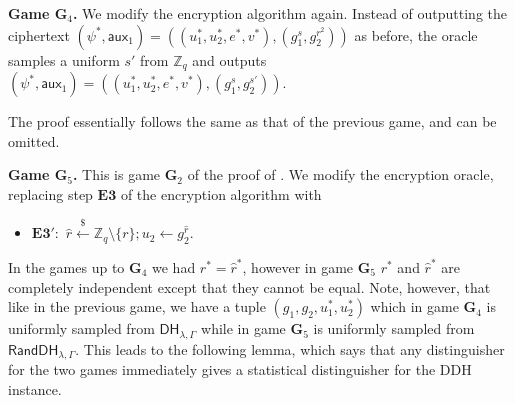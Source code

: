 \documentclass[10pt,a4paper]{article}
\newcommand{\rgets}{\xleftarrow{\$}}
\newcommand{\aux}{\mathsf{aux}}
\newcommand{\game}{\mathbf{G}}
\newcommand{\estep}[1]{\mathbf{E#1}}
\newcommand{\Z}{\mathbb{Z}}
\newcommand{\randdh}{\mathsf{RandDH}}
\newcommand{\ddh}{\mathsf{DH}}
\begin{document}
	\textbf{Game $\game_4$.} We modify the encryption algorithm again. Instead of outputting the ciphertext $(\psi^{*}, \aux_1) = ((u_1^{*}, u_2^{*}, e^{*}, v^{*}), (g_1^{s}, g_2^{r^2}))$ as before, the oracle samples a uniform $s'$ from $\mathbb{Z}_{q}$ and outputs $(\psi^{*}, \aux_1) = ((u_1^{*}, u_2^{*}, e^{*}, v^{*}), (g_1^{s}, g_2^{s'}))$. 
	
	The proof essentially follows the same as that of the previous game, and can be omitted.
	
	\textbf{Game $\game_5$.} This is game $\game_2$ of the proof of \cite{cs01}. We modify the encryption oracle, replacing step $\estep{3}$ of the encryption algorithm with
	\begin{itemize}
		\item[] $\estep{3}':$ $\hat{r}\rgets\Z_q\setminus\{r\}; u_2\gets g_2^{\hat{r}}$.
	\end{itemize}
	In the games up to $\game_4$ we had $r^{*} = \hat{r}^{*}$, however in game $\game_5$ $r^{*}$ and $\hat{r}^{*}$ are completely independent except that they cannot be equal. Note, however, that like in the previous game, we have a tuple $(g_1, g_2, u_1^{*}, u_2^{*})$ which in game $\game_4$ is uniformly sampled from $\ddh_{\lambda,\Gamma}$ while in game $\game_5$ is uniformly sampled from $\randdh_{\lambda,\Gamma}$. This leads to the following lemma, which says that any distinguisher for the two games immediately gives a statistical distinguisher for the DDH instance.
	
\end{document}
